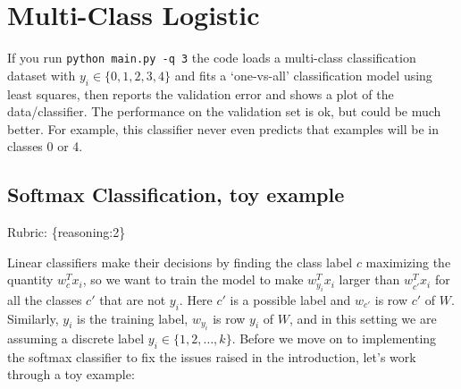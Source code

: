 \documentclass{article}
\def\rubric#1{\gre{Rubric: \{#1\}}}{}
\def\gre#1{{\color{gre}#1}}
\begin{document}
\section{Multi-Class Logistic}

If you run \verb|python main.py -q 3| the code loads a multi-class
classification dataset with $y_i \in \{0,1,2,3,4\}$ and fits a `one-vs-all' classification
model using least squares, then reports the validation error and shows a plot of the data/classifier.
The performance on the validation set is ok, but could be much better.
For example, this classifier never even predicts that examples will be in classes 0 or 4.


\subsection{Softmax Classification, toy example}
\rubric{reasoning:2}

Linear classifiers make their decisions by finding the class label $c$ maximizing the quantity $w_c^Tx_i$, so we want to train the model to make $w_{y_i}^Tx_i$ larger than $w_{c'}^Tx_i$ for all the classes $c'$ that are not $y_i$. 
Here $c'$ is a possible label and $w_{c'}$ is row $c'$ of $W$. Similarly, $y_i$ is the training label, $w_{y_i}$ is row $y_i$ of $W$, and in this setting we are assuming a discrete label $y_i \in \{1,2,\dots,k\}$. Before we move on to implementing the softmax classifier to fix the issues raised in the introduction, let's work through a toy example:
\end{document}
